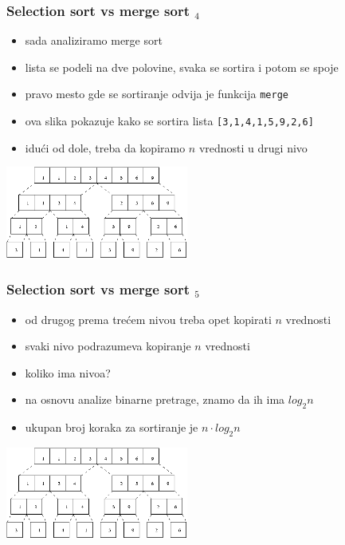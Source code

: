 \documentclass[utf8,compress,aspectratio=169]{beamer}
\begin{document}
\begin{frame}[fragile]
  \frametitle{Selection sort vs merge sort $_4$}
  \begin{itemize}
    \item sada analiziramo merge sort
    \item lista se podeli na dve polovine, svaka se sortira i potom se spoje
    \item pravo mesto gde se sortiranje odvija je funkcija \texttt{merge}
    \item ova slika pokazuje kako se sortira lista \texttt{[3,1,4,1,5,9,2,6]}
    \item idući od dole, treba da kopiramo $n$ vrednosti u drugi nivo
  \end{itemize}
\begin{center}
  \includegraphics[width=6cm]{pic28}
\end{center}
\end{frame}

\begin{frame}[fragile]
  \frametitle{Selection sort vs merge sort $_5$}
  \begin{itemize}
    \item od drugog prema trećem nivou treba opet kopirati $n$ vrednosti
    \item svaki nivo podrazumeva kopiranje $n$ vrednosti
    \item koliko ima nivoa?
    \item na osnovu analize binarne pretrage, znamo da ih ima $log_2 n$
    \item ukupan broj koraka za sortiranje je $n\cdot log_2 n$
  \end{itemize}
\begin{center}
  \includegraphics[width=6cm]{pic28}
\end{center}
\end{frame}
\end{document}
